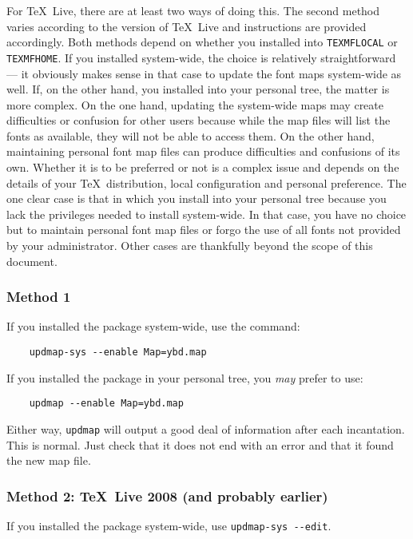 \documentclass[11pt,british]{article}
\begin{document}
For \TeX~Live, there are at least two ways of doing this. The second method varies according to the version of \TeX~Live and instructions are provided accordingly. Both methods depend on whether you installed into \verb|TEXMFLOCAL| or \verb|TEXMFHOME|. If you installed system-wide, the choice is relatively straightforward --- it obviously makes sense in that case to update the font maps system-wide as well. If, on the other hand, you installed into your personal tree, the matter is more complex. On the one hand, updating the system-wide maps may create difficulties or confusion for other users because while the map files will list the fonts as available, they will not be able to access them. On the other hand, maintaining personal font map files can produce difficulties and confusions of its own. Whether it is to be preferred or not is a complex issue and depends on the details of your \TeX\ distribution, local configuration and personal preference. The one clear case is that in which you install into your personal tree because you lack the privileges needed to install system-wide. In that case, you have no choice but to maintain personal font map files or forgo the use of all fonts not provided by your administrator. Other cases are thankfully beyond the scope of this document.

\subsubsection{Method 1}

If you installed the package system-wide, use the command:
\begin{verbatim}
	updmap-sys --enable Map=ybd.map
\end{verbatim}
If you installed the package in your personal tree, you \emph{may} prefer to use:
\begin{verbatim}
	updmap --enable Map=ybd.map
\end{verbatim}

Either way, \verb|updmap| will output a good deal of information after each incantation. This is normal. Just check that it does not end with an error and that it found the new map file.

\subsubsection{Method 2: \TeX~Live 2008 (and probably earlier)}

If you installed the package system-wide, use \verb|updmap-sys --edit|.
\end{document}

